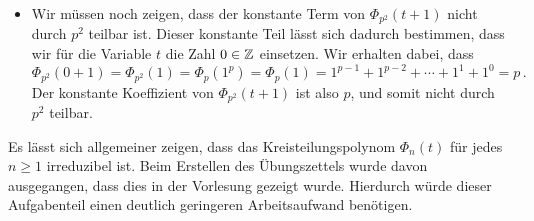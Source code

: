\begin{itemize}
  \item
    Wir müssen noch zeigen, dass der konstante Term von $\Phi_{p^2}(t+1)$ nicht durch $p^2$ teilbar ist.
    Dieser konstante Teil lässt sich dadurch bestimmen, dass wir für die Variable $t$ die Zahl $0 \in \mathbb{Z}$ einsetzen.
    Wir erhalten dabei, dass
    \[
        \Phi_{p^2}(0+1)
      = \Phi_{p^2}(1)
      = \Phi_p(1^p)
      = \Phi_p(1)
      = 1^{p-1} + 1^{p-2} + \dotsb +  1^1 + 1^0
      = p \,.
    \]
    Der konstante Koeffizient von $\Phi_{p^2}(t+1)$ ist also $p$, und somit nicht durch $p^2$ teilbar.
\end{itemize}

\begin{remark}
  Es lässt sich allgemeiner zeigen, dass das Kreisteilungspolynom $\Phi_n(t)$ für jedes $n \geq 1$ irreduzibel ist.
  Beim Erstellen des Übungszettels wurde davon ausgegangen, dass dies in der Vorlesung gezeigt wurde.
  Hierdurch würde dieser Aufgabenteil einen deutlich geringeren Arbeitsaufwand benötigen.
\end{remark}








\addtocounter{subsection}{1}





\addtocounter{subsection}{1}




